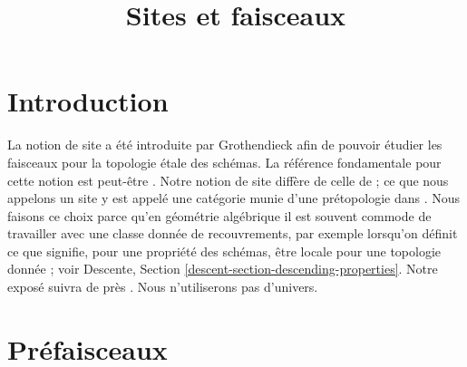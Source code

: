 

%


\title{Sites et faisceaux}


\maketitle

\label{section-phantom}

\tableofcontents

\section{Introduction}
\label{section-introduction}

\noindent
La notion de site a été introduite par Grothendieck afin de pouvoir étudier
les faisceaux pour la topologie \'etale des schémas. La référence fondamentale
pour cette notion est peut-être \cite{SGA4}. Notre notion de site diffère de
celle de \cite{SGA4} ; ce que nous appelons un site y est appelé une catégorie munie
d’une prétopologie dans \cite[Expos\'e II, D\'efinition 1.3]{SGA4}.
Nous faisons ce choix parce qu’en géométrie algébrique il est souvent commode de
travailler avec une classe donnée de recouvrements, par exemple lorsqu’on définit
ce que signifie, pour une propriété des schémas, être locale pour une topologie
donnée ; voir Descente, Section \ref{descent-section-descending-properties}.
Notre exposé suivra de près \cite{ArtinTopologies}.
Nous n’utiliserons pas d’univers.












\section{Préfaisceaux}
\label{section-presheaves}

